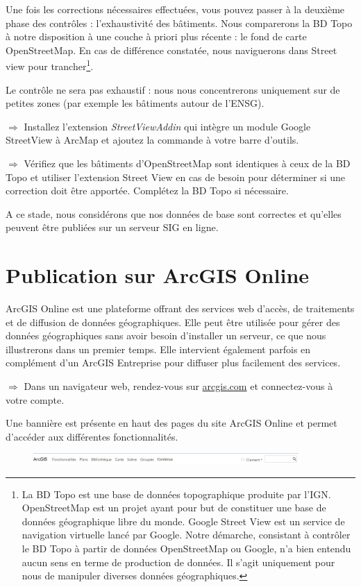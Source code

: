 \documentclass[11pt]{article}
\newcommand{\action}{$\Rightarrow$ }
\begin{document}
Une fois les corrections nécessaires effectuées, vous pouvez passer à la deuxième phase des contrôles : l'exhaustivité des bâtiments. Nous comparerons la BD Topo à notre disposition à une couche à priori plus récente : le fond de carte OpenStreetMap. En cas de différence constatée, nous naviguerons dans Street view pour trancher\footnote{La BD Topo est une base de données topographique produite par l'IGN. OpenStreetMap est un projet ayant pour but de constituer une base de données géographique libre du monde. Google Street View est un service de navigation virtuelle lancé par Google. Notre démarche, consistant à contrôler le BD Topo à partir de données OpenStreetMap ou Google, n'a bien entendu aucun sens en terme de production de données. Il s'agit uniquement pour nous de manipuler diverses données géographiques.}.

Le contrôle ne sera pas exhaustif : nous nous concentrerons uniquement sur de petites zones (par exemple les bâtiments autour de l'ENSG).

\action Installez l'extension \textit{StreetViewAddin} qui intègre un module Google StreetView à ArcMap et ajoutez la commande à votre barre d'outils.

\action Vérifiez que les bâtiments d'OpenStreetMap sont identiques à ceux de la BD Topo et utiliser l'extension Street View en cas de besoin pour déterminer si une correction doit être apportée. Complétez la BD Topo si nécessaire.

A ce stade, nous considérons que nos données de base sont correctes et qu'elles peuvent être publiées sur un serveur SIG en ligne.



\section{Publication sur ArcGIS Online}

ArcGIS Online est une plateforme offrant des services web d'accès, de traitements et de diffusion de données géographiques. Elle peut être utilisée pour gérer des données géographiques sans avoir besoin d'installer un serveur, ce que nous illustrerons dans un premier temps. Elle intervient également parfois en complément d'un ArcGIS Entreprise pour diffuser plus facilement des services.

\action Dans un navigateur web, rendez-vous sur \url{arcgis.com} et connectez-vous à votre compte.

Une bannière est présente en haut des pages du site ArcGIS Online et permet d'accéder aux différentes fonctionnalités.
\begin{figure}[H]
	\center \includegraphics[width=0.9\textwidth]{img/cours3/ago_banniere.jpg} \\
\end{figure}
\end{document}
